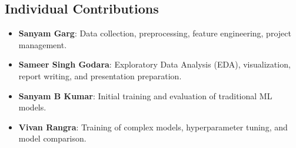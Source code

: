 \documentclass[10pt,twocolumn,letterpaper]{article}
\begin{document}
\subsection{Individual Contributions}
\begin{itemize}
    \item \textbf{Sanyam Garg}: Data collection, preprocessing, feature engineering, project management.
    \item \textbf{Sameer Singh Godara}: Exploratory Data Analysis (EDA), visualization, report writing, and presentation preparation.
    \item \textbf{Sanyam B Kumar}: Initial training and evaluation of traditional ML models.
    \item \textbf{Vivan Rangra}: Training of complex models, hyperparameter tuning, and model comparison.
\end{itemize}
\end{document}

